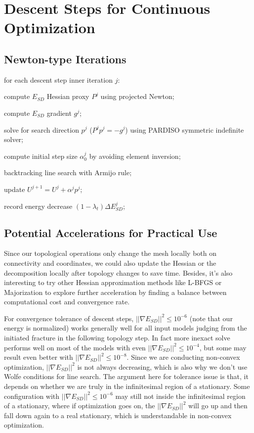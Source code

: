 \section{Descent Steps for Continuous Optimization}

\subsection{Newton-type Iterations}

for each descent step inner iteration $j$:

compute $E_{SD}$ Hessian proxy $P^j$ using projected Newton;

compute $E_{SD}$ gradient $g^j$;

solve for search direction $p^j$ ($P^j p^j = -g^j$) using PARDISO symmetric indefinite solver;

compute initial step size $\alpha^j_0$ by avoiding element inversion;

backtracking line search with Armijo rule;

update $U^{j+1} = U^j + \alpha^j p^j$;

record energy decrease $(1-\lambda_t)\Delta E_{SD}^j$;

\subsection{Potential Accelerations for Practical Use}

Since our topological operations only change the mesh locally both on connectivity and coordinates, we could also update the Hessian or the decomposition locally after topology changes to save time. Besides, it's also interesting to try other Hessian approximation methods like L-BFGS or Majorization to explore further acceleration by finding a balance between computational cost and convergence rate.

For convergence tolerance of descent steps, $||\nabla E_{SD}||^2 \leq 10^{-6}$ (note that our energy is normalized) works generally well for all input models judging from the initiated fracture in the following topology step. In fact more inexact solve performs well on most of the models with even $||\nabla E_{SD}||^2 \leq 10^{-4}$, but some may result even better with $||\nabla E_{SD}||^2 \leq 10^{-8}$. Since we are conducting non-convex optimization, $||\nabla E_{SD}||^2$ is not always decreasing, which is also why we don't use Wolfe conditions for line search. The argument here for tolerance issue is that, it depends on whether we are truly in the infinitesimal region of a stationary. Some configuration with $||\nabla E_{SD}||^2 \leq 10^{-6}$ may still not inside the infinitesimal region of a stationary, where if optimization goes on, the $||\nabla E_{SD}||^2$ will go up and then fall down again to a real stationary, which is understandable in non-convex optimization.
